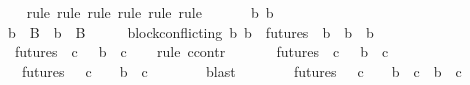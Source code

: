 \begin{isabellebody}
\ \ \isamarkupfalse%
\ {\isacharparenleft}rule{\isacharcomma}\ rule{\isacharcomma}\ rule{\isacharcomma}\ rule{\isacharcomma}\ rule{\isacharcomma}\ rule{\isacharparenright}\ \isanewline
{}\isamarkupfalse%
\ {\isacharminus}\isanewline
\ \ \isamarkupfalse%
\ b{}\ b{}\ {\isasymsigma}\isanewline
\ \ \isamarkupfalse%
\ {\isachardoublequoteopen}b{}\ {\isasymin}\ B\ {\isasymand}\ b{}\ {\isasymin}\ B\ {\isasymand}\ {\isasymsigma}\ {\isasymin}\ {\isasymSigma}{\isachardoublequoteclose}\ \ {\isachardoublequoteopen}block{\isacharunderscore}conflicting\ {\isacharparenleft}b{}{\isacharcomma}\ b{}{\isacharparenright}{\isachardoublequoteclose}\ \ {\isachardoublequoteopen}{\isasymforall}{\isasymsigma}{\isasymin}futures\ {\isasymsigma}{\isachardot}\ {\isasymforall}b{\isacharprime}{\isasymin}{\isasymepsilon}\ {\isasymsigma}{\isachardot}\ b{}\ {\isasymdownharpoonright}\ b{\isacharprime}{\isachardoublequoteclose}\ \isanewline
\ \ \isamarkupfalse%
\ \ {\isachardoublequoteopen}{\isasymforall}{\isasymsigma}{\isasymin}futures\ {\isasymsigma}{\isachardot}\ {\isasymforall}c{\isasymin}{\isasymepsilon}\ {\isasymsigma}{\isachardot}\ {\isasymnot}\ b{}\ {\isasymdownharpoonright}\ c{\isachardoublequoteclose}\isanewline
\ \ \isamarkupfalse%
\ {\isacharparenleft}rule\ ccontr{\isacharparenright}\isanewline
\ \ \ \ \isamarkupfalse%
\ {\isachardoublequoteopen}{\isasymnot}\ {\isacharparenleft}{\isasymforall}{\isasymsigma}{\isasymin}futures\ {\isasymsigma}{\isachardot}\ {\isasymforall}c{\isasymin}{\isasymepsilon}\ {\isasymsigma}{\isachardot}\ {\isasymnot}\ b{}\ {\isasymdownharpoonright}\ c{\isacharparenright}{\isachardoublequoteclose}\isanewline
\ \ \ \ \isamarkupfalse%
\ {\isachardoublequoteopen}{\isasymexists}\ {\isasymsigma}\ {\isasymin}futures\ {\isasymsigma}{\isachardot}\ {\isasymexists}\ c\ {\isasymin}\ {\isasymepsilon}\ {\isasymsigma}{\isachardot}\ b{}\ {\isasymdownharpoonright}\ c{\isachardoublequoteclose}\isanewline
\ \ \ \ \ \ \isamarkupfalse%
\ blast\isanewline
\ \ \ \ \isamarkupfalse%
\ {\isachardoublequoteopen}{\isasymexists}\ {\isasymsigma}\ {\isasymin}futures\ {\isasymsigma}{\isachardot}\ {\isasymexists}\ c\ {\isasymin}\ {\isasymepsilon}\ {\isasymsigma}{\isachardot}\ b{}\ {\isasymdownharpoonright}\ c\ {\isasymand}\ b{}\ {\isasymdownharpoonright}\ c{\isachardoublequoteclose}\isanewline

\end{isabellebody}
